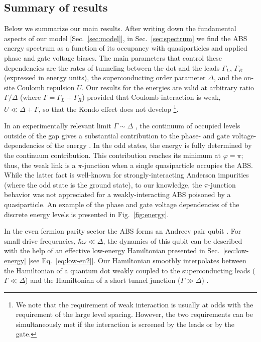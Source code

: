 \documentclass[aps,reprint,longbibliography, prb]{revtex4-2}
\begin{document}
\subsection*{Summary of results}
Below we summarize our main results. After writing down the fundamental aspects of our model [Sec.~\ref{sec:model}], in Sec.~\ref{sec:spectrum} we find the ABS energy spectrum as a function of its occupancy with quasiparticles and applied phase and gate voltage biases.
The main parameters that control these dependencies are the rates of tunneling between the dot and the leads $\Gamma_L$, $\Gamma_R$ (expressed in energy units), the superconducting order parameter $\Delta$, and the on-site Coulomb repulsion $U$. Our results for the energies are valid at arbitrary ratio $\Gamma / \Delta$ (where $\Gamma = \Gamma_L + \Gamma_R$) provided that Coulomb interaction is weak, $U \ll \Delta + \Gamma$, so that the Kondo effect does not develop \footnote{We note that the requirement of weak interaction is usually at odds with the requirement of the large level spacing. However, the two requirements can be simultaneously met if the interaction is screened by the leads or by the gate.}.

In an experimentally relevant limit $\Gamma\sim\Delta$ \cite{marcus2020, kou2020, fatemi2021}, the continuum of occupied levels outside of the gap gives a substantial contribution to the phase- and gate voltage-dependencies of the energy \cite{beenakker1992}.
In the odd states, the energy is fully determined by the continuum contribution. This contribution reaches its minimum at $\varphi = \pi$; thus, the weak link is a $\pi$-junction when a single quasiparticle occupies the ABS. 
While the latter fact is well-known for strongly-interacting Anderson impurities (where the odd state is the ground state), to our knowledge, the $\pi$-junction behavior was not appreciated for a weakly-interacting ABS poisoned by a quasiparticle.
An example of the phase and gate voltage dependencies of the discrete energy levels is presented in Fig.~\ref{fig:energy}.

In the even fermion parity sector the ABS forms an Andreev pair qubit \cite{zazunov2003}. For small drive frequencies, $\hbar\omega \ll \Delta$, the dynamics of this qubit can be described with the help of an effective low-energy Hamiltonian presented in Sec.~\ref{sec:low-energy} [see Eq.~\eqref{eq:low-en2}]. Our Hamiltonian smoothly interpolates between the Hamiltonian of a quantum dot weakly coupled to the superconducting leads ($\Gamma \ll \Delta$) \cite{belzig2020, oriekhov2021} and the Hamiltonian of a short tunnel junction ($\Gamma \gg \Delta$) \cite{feigelman1999, zazunov2003, zazunov2005}.
\end{document}
